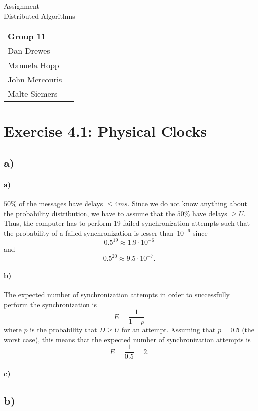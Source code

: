 \documentclass[12pt,a4paper]{article}
\begin{document}
\begin{center}
  \Large Assignment  \\
  \large Distributed Algorithms
\end{center}
\begin{flushright}
  \begin{tabular}{ll}
    \textbf{Group 11} \\
    Dan Drewes        \\ 
    Manuela Hopp      \\ 
    John Mercouris    \\
    Malte Siemers     \\
  \end{tabular} 
\end{flushright}


\section*{Exercise 4.1: Physical Clocks}
  \subsection*{a)} %
  	\paragraph{a)} $50\%$ of the messages have delays $\leq 4ms$. Since we do not know anything about the probability distribution, we have to assume that the $50\%$ have delays $\geq U$. Thus, the computer has to perform 19 failed synchronization attempts such that the probability of a failed synchronization is lesser than~$10^{-6}$ since
  	\[0.5^{19} \approx 1.9 \cdot 10^{-6} \] 
  	and 
  	\[ 0.5^{20} \approx 9.5 \cdot 10^{-7} .\]
  	\paragraph{b)} The expected number of synchronization attempts in order to successfully perform the synchronization is 
  	\[ E = \frac{1}{1-p} \]
  	where $p$ is the probability that $D \geq U$ for an attempt. Assuming that $p=0.5$ (the worst case), this means that the expected number of synchronization attempts is
  	\[ E = \frac{1}{0.5} = 2 .\]
  	\paragraph{c)}
  \subsection*{b)} %
\end{document}
